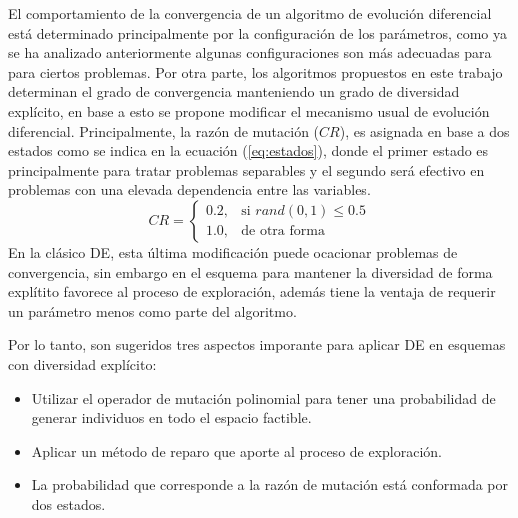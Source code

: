 El comportamiento de la convergencia de un algoritmo de evolución diferencial está determinado principalmente por la configuración de los parámetros, como ya se ha analizado anteriormente algunas configuraciones son más adecuadas para para ciertos problemas.
%
Por otra parte, los algoritmos propuestos en este trabajo determinan el grado de convergencia manteniendo un grado de diversidad explícito, en base a esto se propone modificar el mecanismo usual de evolución diferencial.
%
Principalmente, la razón de mutación ($CR$), es asignada en base a dos estados como se indica en la ecuación (\ref{eq:estados}), donde el primer estado es principalmente para tratar problemas separables y el segundo será efectivo en problemas con una elevada dependencia entre las variables.
\begin{equation} \label{eq:estados}
   CR = 
\begin{cases}
      		0.2 ,& \text{si } rand(0,1) \leq 0.5 \\
    		1.0 ,& \text{de otra forma}
\end{cases}
\end{equation}
En la clásico DE, esta última modificación puede ocacionar problemas de convergencia, sin embargo en el esquema para mantener la diversidad de forma explítito favorece al proceso de exploración, además tiene la ventaja de requerir un parámetro menos como parte del algoritmo.
%

Por lo tanto, son sugeridos tres aspectos imporante para aplicar DE en esquemas con diversidad explícito:
\begin{itemize}
\item Utilizar el operador de mutación polinomial para tener una probabilidad de generar individuos en todo el espacio factible.
\item Aplicar un método de reparo que aporte al proceso de exploración.
\item La probabilidad que corresponde a la razón de mutación está conformada por dos estados.
\end{itemize}

%


